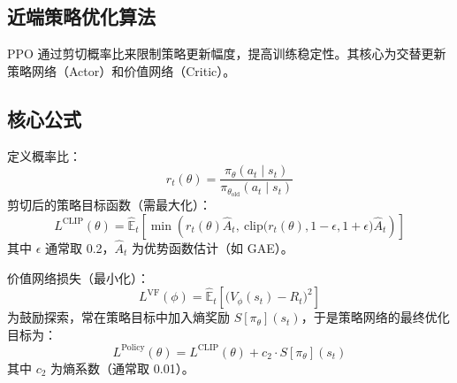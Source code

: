 \documentclass[UTF8]{ctexart}
\begin{document}
\subsection{近端策略优化算法}

PPO 通过剪切概率比来限制策略更新幅度，提高训练稳定性。其核心为交替更新策略网络（Actor）和价值网络（Critic）。

\subsection*{核心公式}
定义概率比：
\[
r_t(\theta) = \frac{\pi_{\theta}(a_t \mid s_t)}{\pi_{\theta_{\text{old}}}(a_t \mid s_t)}
\]
剪切后的策略目标函数（需最大化）：
\[
L^{\text{CLIP}}(\theta) = \hat{\mathbb{E}}_t \left[ \min \left( r_t(\theta) \hat{A}_t,\ \text{clip}\big(r_t(\theta), 1-\epsilon, 1+\epsilon\big) \hat{A}_t \right) \right]
\]
其中 $\epsilon$ 通常取 0.2，$\hat{A}_t$ 为优势函数估计（如 GAE）。

价值网络损失（最小化）：
\[
L^{\text{VF}}(\phi) = \hat{\mathbb{E}}_t \left[ \big( V_{\phi}(s_t) - R_t \big)^2 \right]
\]
为鼓励探索，常在策略目标中加入熵奖励 $S[\pi_{\theta}](s_t)$，于是策略网络的最终优化目标为：
\[
L^{\text{Policy}}(\theta) = L^{\text{CLIP}}(\theta) + c_2 \cdot S[\pi_{\theta}](s_t)
\]
其中 $c_2$ 为熵系数（通常取 0.01）。
\end{document}

